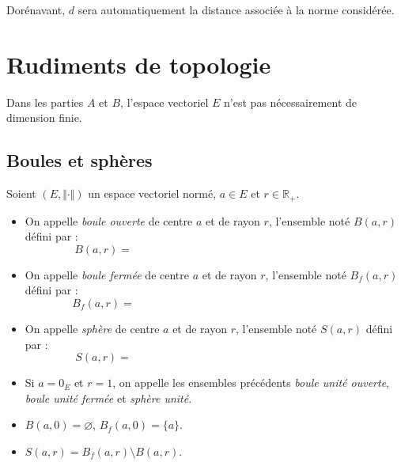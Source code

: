 \documentclass[a4paper,10pt]{report}
\begin{document}
\medskip

Dorénavant, $d$ sera automatiquement la distance associée à la norme considérée.

%


\section{Rudiments de topologie}

Dans les parties $A$ et $B$, l'espace vectoriel $E$ n'est pas nécessairement de dimension finie.
 
\subsection{Boules et sphères}
\begin{Definition}{} Soient $(E, \Vert \cdot \Vert)$ un espace vectoriel normé, $a \in E$ et $r \in \mathbb{R}_+$.

\begin{itemize}
\item On appelle \emph{boule ouverte} de centre $a$ et de rayon $r$, l'ensemble noté $B(a,r)$ défini par :
$$ B(a,r) = \phantom{\lbrace x \in E, \, d(x,a)<r \rbrace =  \lbrace x \in E, \, \Vert x-a \Vert <r \rbrace}$$
\item On appelle \emph{boule fermée} de centre $a$ et de rayon $r$, l'ensemble noté $B_f(a,r)$ défini par :
$$ B_f(a,r) = \phantom{\lbrace x \in E, \, d(x,a) \leq r \rbrace =  \lbrace x \in E, \, \Vert x-a \Vert \leq r \rbrace}$$
\item On appelle \emph{sphère} de centre $a$ et de rayon $r$, l'ensemble noté $S(a,r)$ défini par :
$$ S(a,r) = \phantom{\lbrace x \in E, \, d(x,a) = r \rbrace =  \lbrace x \in E, \, \Vert x-a \Vert = r \rbrace}$$
\item Si $a=0_E$ et $r=1$, on appelle les ensembles précédents \emph{boule unité ouverte}, \emph{boule unité fermée} et \emph{sphère unité}. 
\end{itemize}
\end{Definition}

\begin{Remarques}{}
\begin{itemize}
\item $B(a,0) = \varnothing$, $B_f(a,0) = \lbrace a \rbrace$.
\item $S(a,r)= B_f(a,r) \setminus B(a,r)$.
\end{itemize}
\end{Remarques}{}
\end{document}
